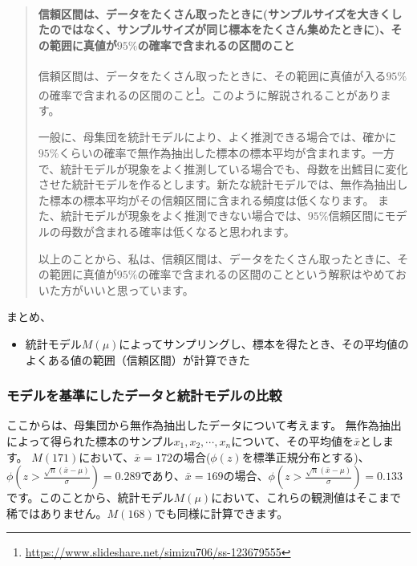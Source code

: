 \documentclass[a4paper,11pt,dvipdfmx]{jsarticle}
\begin{document}
\begin{mybox}
    \begin{quotation}
        \paragraph{信頼区間は、データをたくさん取ったときに(サンプルサイズを大きくしたのではなく、サンプルサイズが同じ標本をたくさん集めたときに)、その範囲に真値が$95\%$の確率で含まれるの区間のこと}
        信頼区間は、データをたくさん取ったときに、その範囲に真値が入る$95\%$の確率で含まれるの区間のこと\footnote{\url{https://www.slideshare.net/simizu706/ss-123679555}}。このように解説されることがあります。

        一般に、母集団を統計モデルにより、よく推測できる場合では、確かに$95\%$くらいの確率で無作為抽出した標本の標本平均が含まれます。一方で、統計モデルが現象をよく推測している場合でも、母数を出鱈目に変化させた統計モデルを作るとします。新たな統計モデルでは、無作為抽出した標本の標本平均がその信頼区間に含まれる頻度は低くなります。
        また、統計モデルが現象をよく推測できない場合では、$95\%$信頼区間にモデルの母数が含まれる確率は低くなると思われます。

        以上のことから、私は、信頼区間は、データをたくさん取ったときに、その範囲に真値が$95\%$の確率で含まれるの区間のことという解釈はやめておいた方がいいと思っています。
    \end{quotation}
\end{mybox}


\begin{framed}
まとめ、
\begin{itemize}
    \item 統計モデル$M(\mu)$によってサンプリングし、標本を得たとき、その平均値のよくある値の範囲（信頼区間）が計算できた
\end{itemize}
\end{framed}

\subsubsection{モデルを基準にしたデータと統計モデルの比較}
ここからは、母集団から無作為抽出したデータについて考えます。
無作為抽出によって得られた標本のサンプル$x_1,x_2,\cdots,x_n$について、その平均値を$\bar{x}$とします。
$M(171)$において、$\bar{x}=172$の場合($\phi(z)$を標準正規分布とする)、$\phi(z>\frac{\sqrt{n}(\bar{x}-\mu)}{\sigma}) = 0.289$であり、$\bar{x}=169$の場合、$\phi(z>\frac{\sqrt{n}(\bar{x}-\mu)}{\sigma}) = 0.133$です。このことから、統計モデル$M(\mu)$において、これらの観測値はそこまで稀ではありません。$M(168)$でも同様に計算できます。
\end{document}
